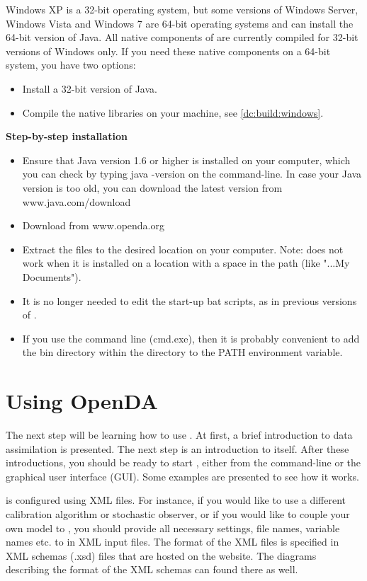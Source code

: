 Windows XP is a 32-bit operating system, but some versions of Windows Server, Windows Vista and Windows 7 are 64-bit operating systems and can install the 64-bit version of Java. All native components of \oda are currently compiled for 32-bit versions of Windows only. If you need these native components on a 64-bit system, you have two options:
\begin{itemize}
\item Install a 32-bit version of Java.
\item Compile the native libraries on your machine, see \ref{dc:build:windows}.
\end{itemize}

\textbf{Step-by-step installation}

\begin{itemize}
\item Ensure that Java version 1.6 or higher is installed on your computer, which you can check by typing java -version on the command-line. In case your Java version is too old, you can download the latest version from www.java.com/download
\item Download \oda from www.openda.org
\item Extract the \oda files to the desired location on your computer.
    Note: \oda does not work when it is installed on a location with a space in the path (like "...My Documents").
\item It is no longer needed to edit the start-up bat scripts, as in previous versions of \oda.
\item If you use the command line (cmd.exe), then it is probably convenient to add the bin directory within the \oda directory to the PATH environment variable.
\end{itemize}

\section{Using OpenDA}
The next step will be learning how to use \oda. At first, a brief introduction to data assimilation is presented. The next step is an introduction to \oda itself. After these introductions, you should be ready to start \oda, either from the command-line or the graphical user interface (GUI). Some examples are presented to see how it works.

\oda is configured using XML files. For instance, if you would like to use a different calibration algorithm or stochastic observer, or if you would like to couple your own model to \oda, you should provide all necessary settings, file names, variable names etc. to \oda in XML input files. The format of the XML files is specified in XML schemas (.xsd) files that are hosted on the \oda website. The diagrams describing the format of the XML schemas can found there as well. 

